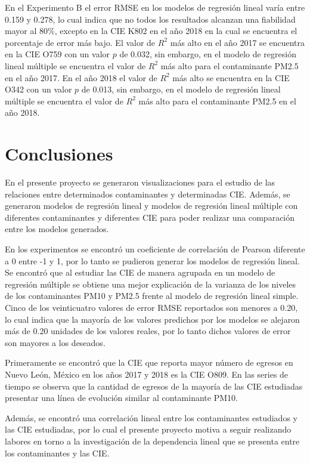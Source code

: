 \documentclass[3p,times]{elsarticle}
\begin{document}
En el Experimento B el error RMSE en los modelos de regresión lineal varía entre 0.159 y 0.278, lo cual indica que no todos los resultados alcanzan una fiabilidad mayor al 80\%, excepto en la CIE K802 en el año 2018 en la cual se encuentra el porcentaje de error más bajo.
El valor de $R^2$ más alto en el año 2017 se encuentra en la CIE O759 con un valor $p$ de 0.032, sin embargo, en el modelo de regresión lineal múltiple se encuentra el valor de $R^2$ más alto para el contaminante PM2.5 en el año 2017. En el año 2018 el valor de $R^2$ más alto se encuentra en la CIE O342 con un valor $p$ de 0.013, sin embargo, en el modelo de regresión lineal múltiple se encuentra el valor de $R^2$ más alto para el contaminante PM2.5 en el año 2018.


\section{Conclusiones}

En el presente proyecto se generaron visualizaciones para el estudio de las relaciones entre determinados contaminantes y determinadas CIE. Además, se generaron modelos de regresión lineal y modelos de regresión lineal múltiple con diferentes contaminantes y diferentes CIE para poder realizar una comparación entre los modelos generados.

En los experimentos se encontró un coeficiente de correlación de Pearson diferente a 0 entre -1 y 1, por lo tanto se pudieron generar los modelos de regresión lineal. Se encontró que al estudiar las CIE de manera agrupada en un modelo de regresión múltiple se obtiene una mejor explicación de la varianza de los niveles de los contaminantes PM10 y PM2.5 frente al modelo de regresión lineal simple. Cinco de los veinticuatro valores de error RMSE reportados son menores a 0.20, lo cual indica que la mayoría de los valores predichos por los modelos se alejaron más de 0.20 unidades de los valores reales, por lo tanto dichos valores de error son mayores a los deseados.

Primeramente se encontró que la CIE que reporta mayor número de egresos en Nuevo León, México en los años 2017 y 2018 es la CIE O809. En las series de tiempo se observa que la cantidad de egresos de la mayoría de las CIE estudiadas presentar una línea de evolución similar al contaminante PM10.

Además, se encontró una correlación lineal entre los contaminantes estudiados y las CIE estudiadas, por lo cual el presente proyecto motiva a seguir realizando labores en torno a la investigación de la dependencia lineal que se presenta entre los contaminantes y las CIE.
\end{document}
